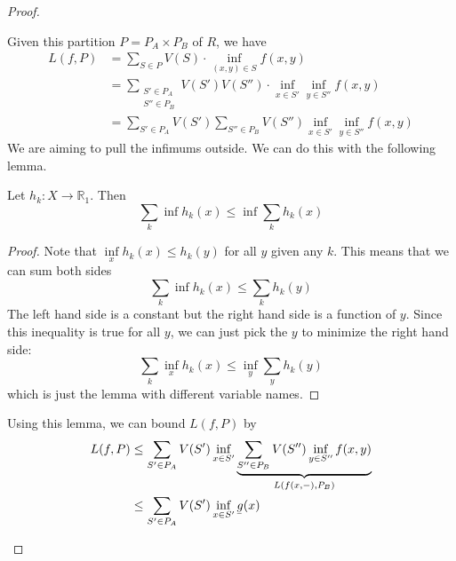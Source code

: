 \documentclass{article}
\newcommand{\ubar}[1]{\underaccent{\bar}{#1}}
\begin{document}
\begin{proof}
\begin{enumerate}
              Given this partition $P=P_A \times P_B$ of $R$, we have
              \begin{align}
                  L(f,P) & = \sum_{S\in P} V(S) \cdot \inf\limits_{(x,y)\in S} f(x,y)                                               \\
                         & = \sum_{\substack{S'\in P_A                                                                              \\ S'' \in P_B}} V(S')V(S'') \cdot \inf\limits_{x \in S'} \inf\limits_{y \in S''} f(x,y)\\
                         & = \sum_{S' \in P_A}V(S') \sum_{S'' \in P_B} V(S'') \inf\limits_{x \in S'} \inf\limits_{y \in S''} f(x,y)
              \end{align}
              We are aiming to pull the infimums outside. We can do this with the following lemma.
              \begin{lemma}
                  Let $h_k: X\rightarrow \mathbb{R}_1$. Then
                  \begin{equation}
                      \sum_k \inf h_k(x) \le \inf \sum_k h_k(x)
                  \end{equation}
              \end{lemma}
              \begin{proof}
                  Note that $\inf\limits_x h_k(x) \le h_k(y)$ for all $y$ given any $k$. This means that we can sum both sides
                  \begin{equation}
                      \sum_k \inf h_k(x) \le \sum_k h_k(y)
                  \end{equation}
                  The left hand side is a constant but the right hand side is a function of $y$. Since this inequality is true for all $y$, we can just pick the $y$ to minimize the right hand side:
                  \begin{equation}
                      \sum_k \inf\limits_x h_k(x) \le \inf\limits_y \sum_y h_k(y)
                  \end{equation}
                  which is just the lemma with different variable names.
              \end{proof}
              Using this lemma, we can bound $L(f,P)$ by
              \begin{align}
                  L(f,P) & \le \sum_{S' \in P_A}V(S')\inf_{x\in S'}\underbrace{\sum_{S''\in P_B}V(S'')\inf_{y\in S''}f(x,y)}_{L(f(x,-),P_B)} \\
                         & \le \sum_{S' \in P_A}V(S')\inf\limits_{x\in S'}\ubar{g}(x)                                                        \\

\end{align}
\end{enumerate}
\end{proof}
\end{document}
